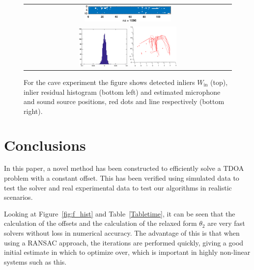 \documentclass{article}
\def\Win{W_{\text{in}}}
\begin{document}
\begin{figure}
\begin{tabular}{c}
\includegraphics[width=0.43\textwidth]{figs/bat_20180710_inl.eps} \\
\includegraphics[width=0.24\textwidth]{figs/bat_20180710_res.eps} 
\includegraphics[width=0.23\textwidth]{figs/bat_20180710_fig.eps} \\
\end{tabular}
\caption{For the cave experiment the figure shows detected inliers $\Win$ (top), inlier residual histogram (bottom left) and  estimated microphone and sound source positions, red dots and line respectively (bottom right).}
\label{f_bat}
\end{figure}

\vspace{-5pt}
\section{Conclusions}
\label{sec:exp}
\vspace{-5pt}
In this paper, a novel method has been constructed to efficiently solve a TDOA problem with a constant offset. This has been verified using simulated data to test the solver and real experimental data to test our algorithms in realistic scenarios.

Looking at Figure~\ref{fig:f_hist} and Table~\ref{Tabletime}, it can be seen that the calculation of the offsets and the calculation of the relaxed form $\theta_2$ are very fast solvers without loss in numerical accuracy. The advantage of this is that when using a RANSAC approach, the iterations are performed quickly, giving a good initial estimate in which to optimize over, which is important in highly
non-linear systems such as this.
\end{document}
